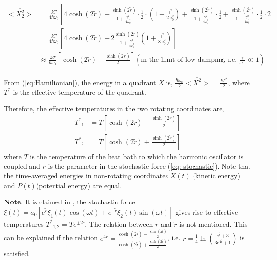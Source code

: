 \documentclass[12pt, twoside]{article}
\begin{document}
 $\begin{aligned}
 <\overline { X _ { 2 } ^ { 2 } } > &= \frac{kT}{4\hbar\omega_0}\left[4\cosh(2\tilde{r}) + \frac{\sinh(2\tilde{r})}{1+\frac{\gamma^2}{4\omega_0^2}}\cdot\frac{1}{2}\cdot\left(1+\frac{\gamma^2}{2\omega_0^2}\right) + \frac{\sinh(2\tilde{r})}{1+\frac{\gamma^2}{4\omega_0^2}}\cdot\frac{1}{2} + \frac{\sinh(2\tilde{r})}{1+\frac{\gamma^2}{4\omega_0^2}}\cdot\frac{1}{2}\cdot2 \right]
 \\ & = \frac{kT}{4\hbar\omega_0}\left[4\cosh(2\tilde{r}) + 2\frac{\sinh(2\tilde{r})}{1+\frac{\gamma^2}{4\omega_0^2}}\left(1+\frac{\gamma^2}{8\omega_0^2}\right) \right]
 \\ & \approx \frac{kT}{\hbar\omega_0}\left[\cosh(2\tilde{r}) + \frac{\sinh(2\tilde{r})}{2}\right] \left(\text{in the limit of low damping, i.e. } \frac{\gamma}{\omega_0} \ll 1\right)
 \end{aligned}$
 
 From (\ref{eq:Hamiltonian}), the energy in a quadrant $X$ is,  $\frac{\hbar\omega_0}{2} <\overline { X ^ { 2 } } > = \frac{kT^*}{2}$, where $T^*$ is the effective temperature of the quadrant.
 
 Therefore, the effective temperatures in the two rotating coordinates are,
 \begin{equation}\label{eq:eff_temp}
 \begin{aligned}
 {T^*}_1 &= T \left[\cosh(2\tilde{r}) - \frac{\sinh(2\tilde{r})}{2}\right]
 \\ {T^*}_2 &= T \left[\cosh(2\tilde{r}) + \frac{\sinh(2\tilde{r})}{2}\right]
 \end{aligned}
 \end{equation}
 where $T$ is the temperature of the heat bath to which the harmonic oscillator is coupled and $r$ is the parameter in the stochastic force (\ref{eq: stochastic}). Note that the time-averaged energies in non-rotating coordinates $X(t)$ (kinetic energy) and $P(t)$(potential energy) are equal.
 
 \textbf{Note}: It is claimed in \cite{klaers}, the stochastic force $\xi(t) =  a_0 [e^{\tilde{r}} \xi_1(t) \cos(\omega t) + e^{-{\tilde{r}}} \xi_2(t)\sin(\omega t)]$ gives rise to effective temperatures ${T^*}_{1,2}
= T e^{\pm 2r}$. The relation between $r$ and $\tilde{r}$ is not mentioned. This can be explained if the relation $e^{4r} = \frac{\cosh(2\tilde{r}) - \frac{\sinh(2\tilde{r})}{2}}{\cosh(2\tilde{r}) + \frac{\sinh(2\tilde{r})}{2}}$, i.e. $r = \frac{1}{4}\ln(\frac{e^{\tilde{r}} + 3}{3 e^{4\tilde{r}} + 1})$ is satisfied.
\end{document}

